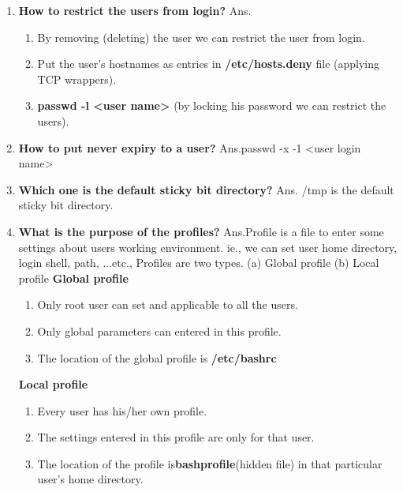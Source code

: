 \begin{enumerate}
    \bigskip 
    \bigskip

    \item \textbf{How to restrict the users from login?}
    \newline
    Ans.\begin{enumerate}
          \item  By removing (deleting) the user we can restrict the user from login.
          \item Put the user's hostnames as entries in  \textbf{/etc/hosts.deny }   file (applying TCP wrappers).
          \item \textbf{passwd   -l    <user name> } (by locking his password we can restrict the users).
        \end{enumerate}
    
    \bigskip
    \bigskip

    \item \textbf{How to put never expiry to a user?}
    \newline
    Ans.passwd     -x    -1    <user login name>

    \bigskip
    \bigskip

    \item \textbf{Which one is the default sticky bit directory?}
    \newline
    Ans.	/tmp    is the default sticky bit directory.

    \bigskip
    \bigskip

    \item \textbf{What is the purpose of the profiles?}
    \newline
    Ans.Profile is a file to enter some settings about users working environment. ie., we can set user home directory, 		login shell, path, ...etc., 
    Profiles are two types.
    (a) Global profile
	  (b) Local profile
    \textbf{Global profile}
     \begin{enumerate}
      \item Only root user can set and applicable to all the users.
      \item Only global parameters can entered in this profile.
      \item The location of the global profile is \textbf{/etc/bashrc}
     \end{enumerate}
    \textbf{Local profile}
     \begin{enumerate}
      \item Every user has his/her own profile.
      \item The settings entered in this profile are only for that user.
      \item The location of the profile is\textbf{bash\-profile}(hidden file)  in that particular user's home directory.
     \end{enumerate}


\end{enumerate}
